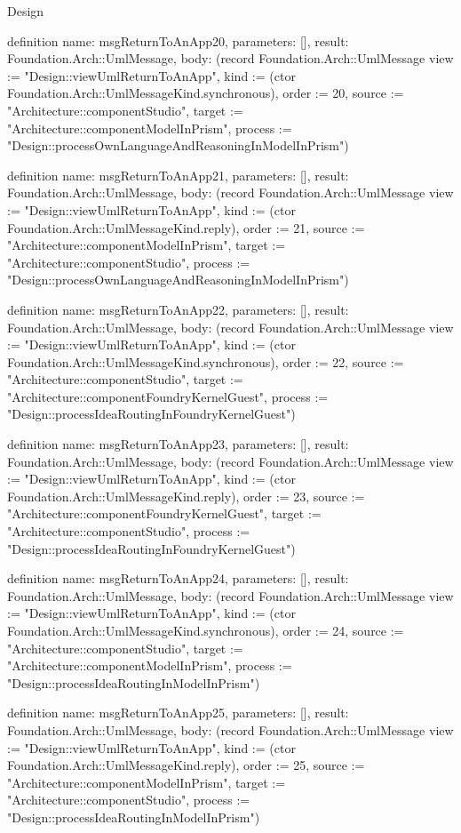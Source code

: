 \begin{lexlean}{Design}
\begin{semanticmodule}
definition{
  name: msgReturnToAnApp20,
  parameters: [],
  result: Foundation.Arch::UmlMessage,
  body: (record Foundation.Arch::UmlMessage {view := "Design::viewUmlReturnToAnApp", kind := (ctor Foundation.Arch::UmlMessageKind.synchronous), order := 20, source := "Architecture::componentStudio", target := "Architecture::componentModelInPrism", process := "Design::processOwnLanguageAndReasoningInModelInPrism"})
}

definition{
  name: msgReturnToAnApp21,
  parameters: [],
  result: Foundation.Arch::UmlMessage,
  body: (record Foundation.Arch::UmlMessage {view := "Design::viewUmlReturnToAnApp", kind := (ctor Foundation.Arch::UmlMessageKind.reply), order := 21, source := "Architecture::componentModelInPrism", target := "Architecture::componentStudio", process := "Design::processOwnLanguageAndReasoningInModelInPrism"})
}

definition{
  name: msgReturnToAnApp22,
  parameters: [],
  result: Foundation.Arch::UmlMessage,
  body: (record Foundation.Arch::UmlMessage {view := "Design::viewUmlReturnToAnApp", kind := (ctor Foundation.Arch::UmlMessageKind.synchronous), order := 22, source := "Architecture::componentStudio", target := "Architecture::componentFoundryKernelGuest", process := "Design::processIdeaRoutingInFoundryKernelGuest"})
}

definition{
  name: msgReturnToAnApp23,
  parameters: [],
  result: Foundation.Arch::UmlMessage,
  body: (record Foundation.Arch::UmlMessage {view := "Design::viewUmlReturnToAnApp", kind := (ctor Foundation.Arch::UmlMessageKind.reply), order := 23, source := "Architecture::componentFoundryKernelGuest", target := "Architecture::componentStudio", process := "Design::processIdeaRoutingInFoundryKernelGuest"})
}

definition{
  name: msgReturnToAnApp24,
  parameters: [],
  result: Foundation.Arch::UmlMessage,
  body: (record Foundation.Arch::UmlMessage {view := "Design::viewUmlReturnToAnApp", kind := (ctor Foundation.Arch::UmlMessageKind.synchronous), order := 24, source := "Architecture::componentStudio", target := "Architecture::componentModelInPrism", process := "Design::processIdeaRoutingInModelInPrism"})
}

definition{
  name: msgReturnToAnApp25,
  parameters: [],
  result: Foundation.Arch::UmlMessage,
  body: (record Foundation.Arch::UmlMessage {view := "Design::viewUmlReturnToAnApp", kind := (ctor Foundation.Arch::UmlMessageKind.reply), order := 25, source := "Architecture::componentModelInPrism", target := "Architecture::componentStudio", process := "Design::processIdeaRoutingInModelInPrism"})
}


\end{semanticmodule}
\end{lexlean}
